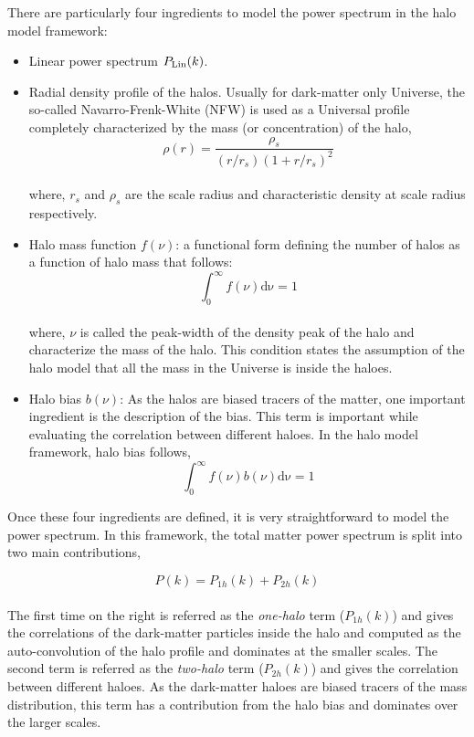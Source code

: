 There are particularly four ingredients to model the power spectrum in the halo model framework:

\begin{itemize}
	\item Linear power spectrum $P_{\rm Lin}(k)$.

	\item Radial density profile of the halos. Usually for dark-matter only Universe, the so-called
			Navarro-Frenk-White (NFW) is used as a Universal profile completely characterized by the
			mass (or concentration) of the halo,
			\begin{equation}
				\rho(r) = \dfrac{\rho_s}{(r/r_s)(1+r/r_s)^2}
			\end{equation}
			\\
			where, $r_s$ and $\rho_s$ are the scale radius and characteristic density at scale radius
			respectively.

	\item Halo mass function $f(\nu)$: a functional form defining the number of halos as a function of halo
			mass that follows:
			\begin{equation}
				\int_0^{\infty} f(\nu)\mathrm{d\nu} = 1
			\end{equation}
			\\
			where, $\nu$ is called the peak-width of the density peak of the halo 
			and characterize the mass of the halo. This condition states the assumption of the
			halo model that all the mass in the Universe is inside the haloes. 

	\item Halo bias $b(\nu)$: As the halos are biased tracers of the matter, one important ingredient is 
			the description of the bias. This term is important while evaluating the correlation
			between different haloes. In the halo model framework, halo bias follows,
			\begin{equation}
				\int_0^{\infty} f(\nu) b(\nu) \mathrm{d\nu} = 1
			\end{equation}
\end{itemize}

Once these four ingredients are defined, 
it is very straightforward to model the power spectrum. In this framework, the
total matter power spectrum is split into two main contributions,

\begin{equation}
	P(k) = P_{1h}(k)  + P_{2h}(k)
\end{equation}
\\
The first time on the right is referred as the {\it one-halo} term ($P_{1h}(k)$) and gives
the correlations of the dark-matter particles inside the halo and computed as
the auto-convolution of the halo profile and dominates at the smaller scales. 
The second term is referred as the {\it two-halo}
term ($P_{2h}(k)$) and gives the correlation between different haloes. As the 
dark-matter haloes are biased tracers of the mass distribution, this term has a 
contribution from the halo bias and dominates over the larger scales. 

